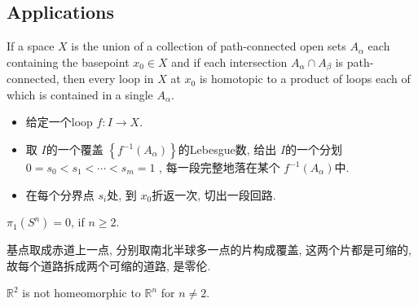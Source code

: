 \documentclass[../main.tex]{subfiles}
\begin{document}
\subsection*{Applications}


\begin{lemma}{}{}
If a space $X$ is the union of a collection of path-connected open sets $A_{\alpha}$ each containing the basepoint $x_{0} \in X$ and if each intersection $A_{\alpha} \cap A_{\beta}$ is path-connected, then every loop in $X$ at $x_{0}$ is homotopic to a product of loops each of which is contained in a single $A_{\alpha}$.
\end{lemma}

\begin{proofsketch}
    \begin{itemize}
        \item 给定一个loop \(  f:I\to X  \).
        \item 取 \(  I  \)的一个覆盖  \(  \left\{ f^{-1} \left( A_{\alpha } \right)  \right\}  \)的Lebesgue数, 给出 \(  I  \)的一个分划\(  0= s_0< s_1< \cdots < s_{m}= 1  \) , 每一段完整地落在某个 \( f^{-1} \left( A_{\alpha } \right)   \)中.   
        \item 在每个分界点 \(  s_{i}  \)处, 到 \(  x_0  \)折返一次, 切出一段回路.  
    \end{itemize}
    
\end{proofsketch}

\begin{proposition}{}{}
    \(   \pi _1 \left( S^{n}\right)   = 0 \), if  \(  n\ge 2  \).  
\end{proposition}
\begin{proofsketch}
    基点取成赤道上一点, 分别取南北半球多一点的片构成覆盖, 这两个片都是可缩的, 故每个道路拆成两个可缩的道路, 是零伦. 
\end{proofsketch}

\begin{corollary}{}{}
    \(  \mathbb{R} ^{2}  \) is not homeomorphic to \(  \mathbb{R} ^{n}  \) for \(  n \neq 2  \).   
\end{corollary}
\end{document}
